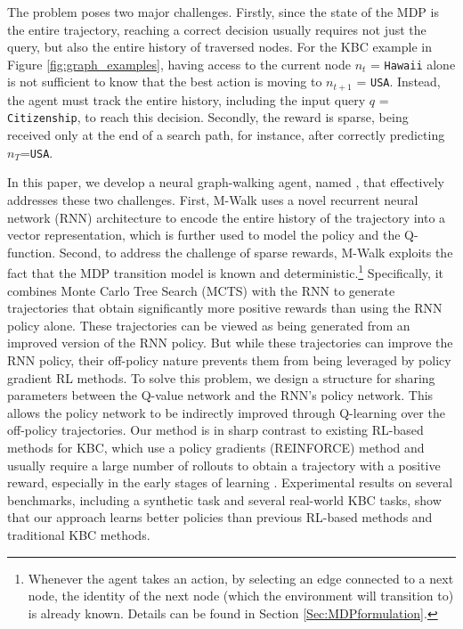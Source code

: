 \documentclass{article}
\begin{document}
	The problem poses two major challenges. Firstly, since the state of the MDP is the entire trajectory, reaching a correct decision usually requires not just the query, but also the entire history of traversed nodes. For the KBC example in Figure \ref{fig:graph_examples}, having access to the current node $n_t$ = \texttt{Hawaii} alone is not sufficient to know that the best action is moving to $n_{t+1}$ = \texttt{USA}. Instead, the agent must track the entire history, including the input query $q$ = \texttt{Citizenship}, to reach this decision. Secondly, the reward is sparse, being received only at the end of a search path, for instance, after correctly predicting $n_T$=\texttt{USA}. 
	
	In this paper, we develop a neural graph-walking agent, named \emph{\modelname}, that effectively addresses these two challenges. First, M-Walk uses a novel recurrent neural network (RNN) architecture to encode the entire history of the trajectory into a vector representation, which is further used to model the policy and the Q-function. Second, to address the challenge of sparse rewards, M-Walk exploits the fact that the MDP transition model is known and deterministic.\footnote{Whenever the agent takes an action, by selecting an edge connected to a next node, the identity of the next node (which the environment will transition to) is already known. Details can be found in Section \ref{Sec:MDPformulation}.} Specifically, it combines Monte Carlo Tree Search (MCTS) with the RNN to generate trajectories that obtain significantly more positive rewards than using the RNN policy alone. These trajectories can be viewed as being generated from an improved version of the RNN policy. But while these trajectories can improve the RNN policy, their off-policy nature prevents them from being leveraged by policy gradient RL methods. To solve this problem, we design a structure for sharing parameters between the Q-value network and the RNN's policy network. This allows the policy network to be indirectly improved through Q-learning over the off-policy trajectories. Our method is in sharp contrast to existing RL-based methods for KBC, which use a policy gradients (REINFORCE) method \cite{williams1992simple} and usually require a large number of rollouts to obtain a trajectory with a positive reward, especially in the early stages of learning \cite{gu2016q,wu2017scalable,kakade2002natural}. Experimental results on several benchmarks, including a synthetic task and several real-world KBC tasks, show that our approach learns better policies than previous RL-based methods and traditional KBC methods.
\end{document}
